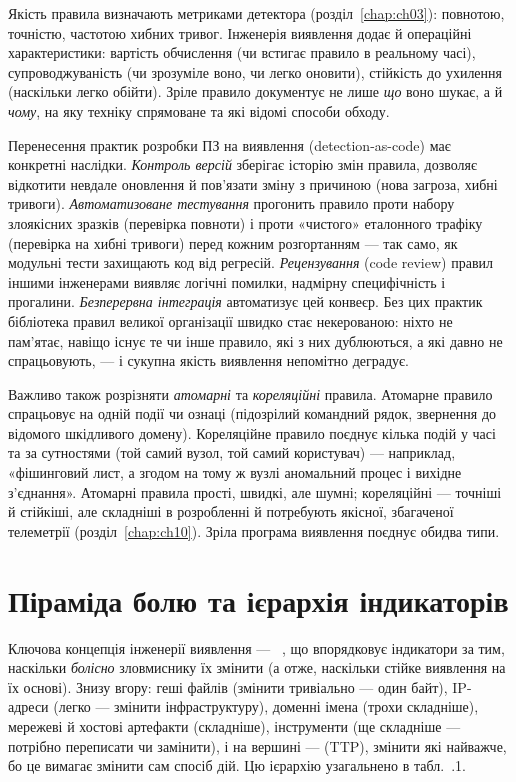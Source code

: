 Якість правила визначають метриками детектора (розділ~\ref{chap:ch03}): повнотою, точністю, частотою хибних тривог. Інженерія виявлення додає й операційні характеристики: вартість обчислення (чи встигає правило в реальному часі), супроводжуваність (чи зрозуміле воно, чи легко оновити), стійкість до ухилення (наскільки легко обійти). Зріле правило документує не лише \emph{що} воно шукає, а й \emph{чому}, на яку техніку спрямоване та які відомі способи обходу.

Перенесення практик розробки ПЗ на виявлення (detection-as-code) має конкретні наслідки. \emph{Контроль версій} зберігає історію змін правила, дозволяє відкотити невдале оновлення й пов'язати зміну з причиною (нова загроза, хибні тривоги). \emph{Автоматизоване тестування} прогонить правило проти набору злоякісних зразків (перевірка повноти) і проти «чистого» еталонного трафіку (перевірка на хибні тривоги) перед кожним розгортанням --- так само, як модульні тести захищають код від регресій. \emph{Рецензування} (code review) правил іншими інженерами виявляє логічні помилки, надмірну специфічність і прогалини. \emph{Безперервна інтеграція} автоматизує цей конвеєр. Без цих практик бібліотека правил великої організації швидко стає некерованою: ніхто не пам'ятає, навіщо існує те чи інше правило, які з них дублюються, а які давно не спрацьовують, --- і сукупна якість виявлення непомітно деградує.

Важливо також розрізняти \emph{атомарні} та \emph{кореляційні} правила. Атомарне правило спрацьовує на одній події чи ознаці (підозрілий командний рядок, звернення до відомого шкідливого домену). Кореляційне правило поєднує кілька подій у часі та за сутностями (той самий вузол, той самий користувач) --- наприклад, «фішинговий лист, а згодом на тому ж вузлі аномальний процес і вихідне з'єднання». Атомарні правила прості, швидкі, але шумні; кореляційні --- точніші й стійкіші, але складніші в розробленні й потребують якісної, збагаченої телеметрії (розділ~\ref{chap:ch10}). Зріла програма виявлення поєднує обидва типи.

\section{Піраміда болю та ієрархія індикаторів}\label{sec:ch11-pyramid}

Ключова концепція інженерії виявлення --- ~\cite{pyramid}, що впорядковує індикатори за тим, наскільки \emph{болісно} зловмиснику їх змінити (а отже, наскільки стійке виявлення на їх основі). Знизу вгору: геші файлів (змінити тривіально --- один байт), IP-адреси (легко --- змінити інфраструктуру), доменні імена (трохи складніше), мережеві й хостові артефакти (складніше), інструменти (ще складніше --- потрібно переписати чи замінити), і на вершині ---  (TTP), змінити які найважче, бо це вимагає змінити сам спосіб дій. Цю ієрархію узагальнено в табл.~\thechapter.1.


